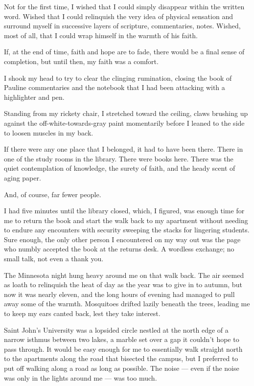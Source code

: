 Not for the first time, I wished that I could simply disappear within the written word. Wished that I could relinquish the very idea of physical sensation and surround myself in successive layers of scripture, commentaries, notes. Wished, most of all, that I could wrap himself in the warmth of his faith.

If, at the end of time, faith and hope are to fade, there would be a final sense of completion, but until then, my faith was a comfort.

I shook my head to try to clear the clinging rumination, closing the book of Pauline commentaries and the notebook that I had been attacking with a highlighter and pen.

Standing from my rickety chair, I stretched toward the ceiling, claws brushing up against the off-white-towards-gray paint momentarily before I leaned to the side to loosen muscles in my back.

If there were any one place that I belonged, it had to have been there. There in one of the study rooms in the library. There were books here. There was the quiet contemplation of knowledge, the surety of faith, and the heady scent of aging paper.

And, of course, far fewer people.

I had five minutes until the library closed, which, I figured, was enough time for me to return the book and start the walk back to my apartment without needing to endure any encounters with security sweeping the stacks for lingering students. Sure enough, the only other person I encountered on my way out was the page who numbly accepted the book at the returns desk. A wordless exchange; no small talk, not even a thank you.

The Minnesota night hung heavy around me on that walk back. The air seemed as loath to relinquish the heat of day as the year was to give in to autumn, but now it was nearly eleven, and the long hours of evening had managed to pull away some of the warmth. Mosquitoes drifted lazily beneath the trees, leading me to keep my ears canted back, lest they take interest.

Saint John's University was a lopsided circle nestled at the north edge of a narrow isthmus between two lakes, a marble set over a gap it couldn't hope to pass through. It would be easy enough for me to essentially walk straight north to the apartments along the road that bisected the campus, but I preferred to put off walking along a road as long as possible. The noise --- even if the noise was only in the lights around me --- was too much.

